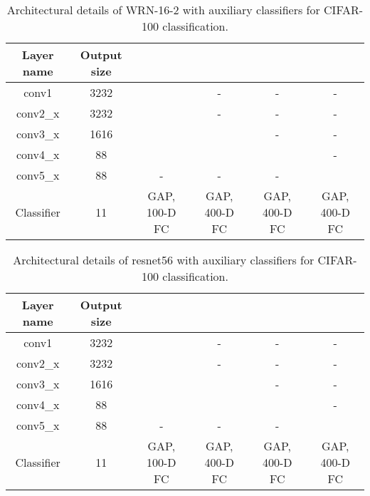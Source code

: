 \documentclass{article}
\begin{document}
\begin{table*}
	\centering
	\begin{tabular}{c|c|c|c|c|c}
		\hline
		Layer name & Output size & & & & \\ 	\hline
		conv1&  3232 &   &-&-&-\\  \hline
		conv2\_x &  3232              & 
		  &  -&  - &  -  \\  \hline
		conv3\_x &  1616           & 
		  &   & - & -  \\  \hline
		conv4\_x &  88           & 
		  &  &  & -  \\  \hline
		conv5\_x &  88           & - &  -&  - &    \\  \hline
		Classifier &  11  &  GAP, 100-D FC&  GAP, 400-D FC &  GAP, 400-D FC&  GAP, 400-D FC  \\  \hline
	\end{tabular}
	\caption{Architectural details of WRN-16-2 with auxiliary classifiers for CIFAR-100 classification.}
	\label{wrn162}
\end{table*}



\begin{table*}
	\centering
	\begin{tabular}{c|c|c|c|c|c}
		\hline
		Layer name & Output size & & & & \\ 	\hline
		conv1&  3232 &   &-&-&-\\  \hline
		conv2\_x &  3232              & 
		  &  -&  - &  -  \\  \hline
		conv3\_x &  1616           & 
		  &   & - & -  \\  \hline
		conv4\_x &  88           & 
		  &  &  & -  \\  \hline
		conv5\_x &  88           & - &  -&  - &    \\  \hline
		Classifier &  11  &  GAP, 100-D FC&  GAP, 400-D FC &  GAP, 400-D FC&  GAP, 400-D FC  \\  \hline
	\end{tabular}
	\caption{Architectural details of resnet56 with auxiliary classifiers for CIFAR-100 classification.}
	\label{resnet56}
\end{table*}
\end{document}
